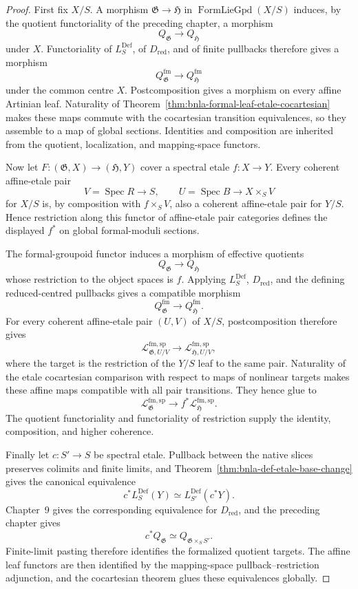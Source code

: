 \begin{proof}
First fix $X/S$.  A morphism
$\mathfrak G\to\mathfrak H$ in
$\operatorname{FormLieGpd}(X/S)$ induces, by the quotient functoriality of the
preceding chapter, a morphism
\[
    Q_{\mathfrak G}\longrightarrow Q_{\mathfrak H}
\]
under $X$.  Functoriality of $L^{\mathrm{Def}}_S$, of $D_{\mathrm{red}}$,
and of finite pullbacks therefore gives a morphism
\[
    Q^{\mathrm{fm}}_{\mathfrak G}
    \longrightarrow
    Q^{\mathrm{fm}}_{\mathfrak H}
\]
under the common centre $X$.  Postcomposition gives a morphism on every
affine Artinian leaf.  Naturality of
Theorem~\ref{thm:bnla-formal-leaf-etale-cocartesian} makes these maps commute
with the cocartesian transition equivalences, so they assemble to a map of
global sections.  Identities and composition are inherited from the quotient,
localization, and mapping-space functors.

Now let $F:(\mathfrak G,X)\to(\mathfrak H,Y)$ cover a spectral etale
$f:X\to Y$.  Every coherent affine-etale pair
\[
    V=\operatorname{Spec}R\to S,
    \qquad
    U=\operatorname{Spec}B\to X\times_SV
\]
for $X/S$ is, by composition with $f\times_SV$, also a coherent affine-etale
pair for $Y/S$.  Hence restriction along this functor of affine-etale pair
categories defines the displayed $f^*$ on global formal-moduli sections.

The formal-groupoid functor induces a morphism of effective quotients
\[
    Q_{\mathfrak G}\longrightarrow Q_{\mathfrak H}
\]
whose restriction to the object spaces is $f$.  Applying
$L^{\mathrm{Def}}_S$, $D_{\mathrm{red}}$, and the defining reduced-centred
pullbacks gives a compatible morphism
\[
    Q^{\mathrm{fm}}_{\mathfrak G}
    \longrightarrow
    Q^{\mathrm{fm}}_{\mathfrak H}.
\]
For every coherent affine-etale pair $(U,V)$ of $X/S$, postcomposition
therefore gives
\[
    \mathcal L^{\mathrm{fm,sp}}_{\mathfrak G,U/V}
    \longrightarrow
    \mathcal L^{\mathrm{fm,sp}}_{\mathfrak H,U/V},
\]
where the target is the restriction of the $Y/S$ leaf to the same pair.
Naturality of the etale cocartesian comparison with respect to maps of
nonlinear targets makes these affine maps compatible with all pair
transitions.  They hence glue to
\[
    \mathcal L^{\mathrm{fm,sp}}_{\mathfrak G}
    \longrightarrow
    f^*\mathcal L^{\mathrm{fm,sp}}_{\mathfrak H}.
\]
The quotient functoriality and functoriality of restriction supply the
identity, composition, and higher coherence.

Finally let $c:S'\to S$ be spectral etale.  Pullback between the native
slices preserves colimits and finite limits, and
Theorem~\ref{thm:bnla-def-etale-base-change} gives the canonical equivalence
\[
\boxed{
    c^*L^{\mathrm{Def}}_S(Y)
    \simeq
    L^{\mathrm{Def}}_{S'}(c^*Y).}
\]
Chapter~9 gives the corresponding equivalence for $D_{\mathrm{red}}$, and the
preceding chapter gives
\[
    c^*Q_{\mathfrak G}
    \simeq
    Q_{\mathfrak G\times_SS'}.
\]
Finite-limit pasting therefore identifies the formalized quotient targets.
The affine leaf functors are then identified by the mapping-space
pullback--restriction adjunction, and the cocartesian theorem glues these
equivalences globally.


\end{proof}
